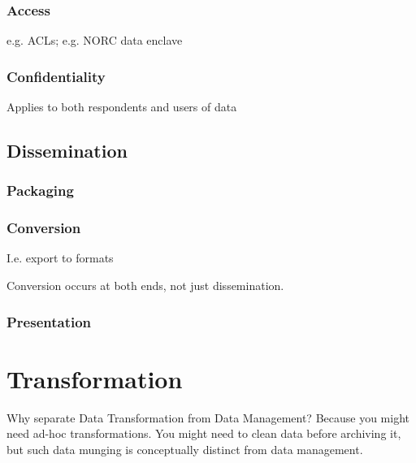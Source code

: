 \documentclass[reqno,12pt]{tufte-book}
\numberwithin{equation}{subsection}
\begin{document}
\section{Access}
\label{sect:access}

e.g. ACLs; e.g. NORC data enclave

\section{Confidentiality}
\label{sect:confidentiality}

Applies to both respondents and users of data

\chapter{Dissemination}

\section{Packaging}
\label{sect:datapkg}

\section{Conversion}
\label{sect:conversion}

I.e. export to formats

Conversion occurs at both ends, not just dissemination.

\section{Presentation}
\label{sect:datapresentation}

\part{Transformation}

\begin{ednote}
  Why separate Data Transformation from Data Management?  Because you
  might need ad-hoc transformations.  You might need to clean data
  before archiving it, but such data munging is conceptually distinct
  from data management.
\end{ednote}
\end{document}

